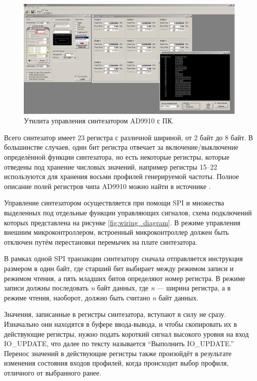 \documentclass[rusmathsym, eqnumwithinsec, amspack, hyperref]{bomgost}
\begin{document}
\begin{gostfigure}
\begin{figure}[H]
\centering
\includegraphics[scale=.25]{data/ad9910_evaluation_software.png}
\caption{Утилита управления синтезатором AD9910 с ПК.}
\label{fig:ad9910_evaluation_software}
\end{figure}
\end{gostfigure}

Всего синтезатор имеет 23 регистра с различной шириной, от 2 байт до 8 байт. В большинстве случаев, один бит регистра отвечает за включение/выключение определённой функции синтезатора, но есть некоторые регистры, которые отведены под хранение числовых значений, например регистры 15--22 используются для хранения восьми профилей генерируемой частоты. Полное описание полей регистров чипа AD9910 можно найти в источнике \cite{AD9910Datasheet}.

Управление синтезатором осуществляется при помощи SPI и множества выделенных под отдельные функции управляющих сигналов, схема подключений которых представлена на рисунке \ref{fig:wiring_diagram}. В режиме управления внешним микроконтроллером, встроенный микроконтроллер должен быть отключен путём перестановки перемычек на плате синтезатора.

В рамках одной SPI транзакции синтезатору сначала отправляется инструкция размером в один байт, где старший бит выбирает между режимом записи и режимом чтения, а пять младших битов определяют номер регистра. В режиме записи должны последовать {\em n} байт данных, где {\em n} --- ширина регистра, а в режиме чтения, наоборот, должно быть считано {\em n} байт данных.

Значения, записанные в регистры синтезатора, вступают в силу не сразу. Изначально они находятся в буфере ввода-вывода, и чтобы скопировать их в действующие регистры, нужно подать короткий сигнал высокого уровня на вход IO\_UPDATE, что далее по тексту называется ``Выполнить IO\_UPDATE.'' Перенос значений в действующие регистры также произойдёт в результате изменения состояния входов профилей, когда происходит выбор профиля, отличного от выбранного ранее.
\end{document}
